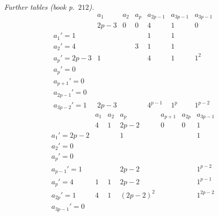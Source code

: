 \documentclass[11pt]{article}
\begin{document}
\noindent\textit{Further tables (book p.~$212$).}
\[
\begin{array}{l|cccccc}
              & a_{1}    & a_{2}    & a_{p}    & a_{2p-1}    & a_{3p-1}    & a_{3p-1}\\
              & 2p-3     & 0        & 0        & 4           & 1           & 0\\
\hline
a_{1}'=1      &          &          &          & 1           & 1           & \\
a_{2}'=4      &          &          & 3        & 1           & 1           & \\
a_{p}'=2p-3   & 1        &          &          & 4           & 1           & 1^{2}\\
a_{p}'=0      &          &          &          &             &             & \\
a_{p+1}'=0    &          &          &          &             &             & \\
a_{2p-1}'=0   &          &          &          &             &             & \\
a_{3p-2}'=1   & 2p-3     &          &          & 4^{p-1}     & 1^{p}       & 1^{p-2}
\end{array}
\]
\[
\begin{array}{l|cccccc}
              & a_{1}    & a_{2}    & a_{p}    & a_{p+1}     & a_{2p}      & a_{3p-1}\\
              & 4        & 1        & 2p-2     & 0           & 0           & 1\\
\hline
a_{1}'=2p-2   &          &          & 1        &             &             & 1\\
a_{2}'=0      &          &          &          &             &             & \\
a_{p}'=0      &          &          &          &             &             & \\
a_{p-1}'=1    &          &          & 2p-2     &             &             & 1^{p-2}\\
a_{p}'=4      & 1        & 1        & 2p-2     &             &             & 1^{p-1}\\
a_{2p}'=1     & 4        & 1        & (2p-2)^{2}&            &             & 1^{2p-2}\\
a_{3p-1}'=0   &          &          &          &             &             &
\end{array}
\]

\end{document}
